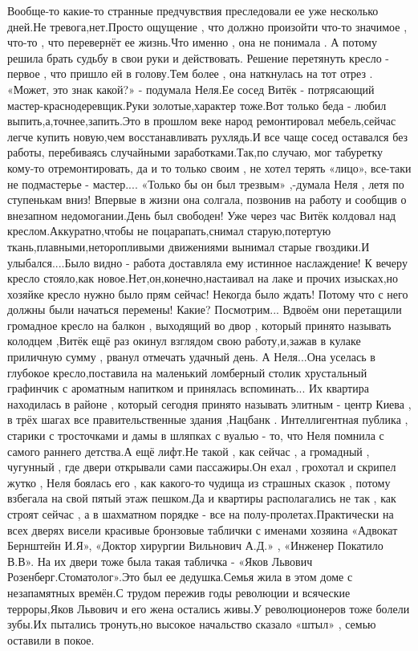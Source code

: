 Вообще-то какие-то странные предчувствия преследовали ее уже несколько дней.Не тревога,нет.Просто ощущение , что должно произойти что-то значимое , что-то , что перевернёт ее жизнь.Что именно , она не понимала . А потому решила брать судьбу в свои руки и действовать. Решение перетянуть кресло - первое , что пришло ей в голову.Тем более , она наткнулась на тот отрез . «Может, это знак какой?» - подумала Неля.Ее сосед Витёк - потрясающий мастер-краснодеревщик.Руки золотые,характер тоже.Вот только беда - любил выпить,а,точнее,запить.Это в прошлом веке народ ремонтировал мебель,сейчас легче купить новую,чем восстанавливать рухлядь.И все чаще сосед оставался без работы, перебиваясь случайными заработками.Так,по случаю, мог табуретку кому-то отремонтировать, да и то только своим , не хотел терять «лицо», все-таки не подмастерье - мастер.... «Только бы он был трезвым» ,-думала Неля , летя по ступенькам вниз! Впервые в жизни она солгала, позвонив на работу и сообщив о внезапном недомогании.День был свободен! 
Уже через час Витёк колдовал над креслом.Аккуратно,чтобы не поцарапать,снимал старую,потертую ткань,плавными,неторопливыми движениями вынимал старые гвоздики.И улыбался....Было видно - работа доставляла ему истинное наслаждение! К вечеру кресло стояло,как новое.Нет,он,конечно,настаивал на лаке и прочих изысках,но хозяйке кресло нужно было прям сейчас! Некогда было ждать! Потому что с него должны были начаться перемены! Какие? Посмотрим...
Вдвоём они перетащили громадное кресло на балкон , выходящий во двор , который принято называть колодцем ,Витёк ещё раз окинул взглядом свою работу,и,зажав в кулаке приличную сумму , рванул отмечать удачный день.
А Неля...Она уселась в глубокое кресло,поставила на маленький ломберный столик хрустальный графинчик с ароматным напитком и принялась вспоминать...
Их квартира находилась в районе , который сегодня принято называть элитным - центр Киева , в трёх шагах все правительственные здания ,Нацбанк . Интеллигентная публика , старики с тросточками и дамы в шляпках с вуалью - то, что Неля  помнила с самого раннего детства.А ещё лифт.Не такой , как сейчас , а громадный , чугунный , где двери открывали сами пассажиры.Он ехал , грохотал  и скрипел жутко , Неля боялась его , как какого-то чудища из страшных сказок , потому взбегала на свой пятый этаж пешком.Да и квартиры располагались не так , как строят сейчас , а в шахматном порядке - все на полу-пролетах.Практически на всех дверях висели красивые бронзовые таблички с именами хозяина «Адвокат Бернштейн И.Я», «Доктор хирургии Вильнович А.Д.» , «Инженер Покатило В.В». На их двери тоже была такая табличка - «Яков Львович Розенберг.Стоматолог».Это был ее дедушка.Семья жила в этом доме с незапамятных времён.С трудом пережив годы революции и всяческие терроры,Яков Львович и его жена остались живы.У революционеров тоже болели зубы.Их пытались тронуть,но высокое начальство сказало «штыл» , семью оставили в покое.
